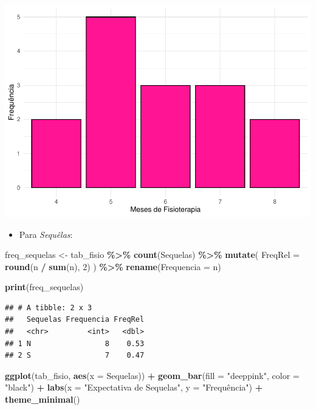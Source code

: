 \documentclass[
]{book}
\newenvironment{Shaded}{\begin{snugshade}}{\end{snugshade}}
\newcommand{\AttributeTok}[1]{\textcolor[rgb]{0.13,0.29,0.53}{#1}}
\newcommand{\DecValTok}[1]{\textcolor[rgb]{0.00,0.00,0.81}{#1}}
\newcommand{\FunctionTok}[1]{\textcolor[rgb]{0.13,0.29,0.53}{\textbf{#1}}}
\newcommand{\NormalTok}[1]{#1}
\newcommand{\OtherTok}[1]{\textcolor[rgb]{0.56,0.35,0.01}{#1}}
\newcommand{\SpecialCharTok}[1]{\textcolor[rgb]{0.81,0.36,0.00}{\textbf{#1}}}
\newcommand{\StringTok}[1]{\textcolor[rgb]{0.31,0.60,0.02}{#1}}
\providecommand{\tightlist}{%
  \setlength{\itemsep}{0pt}\setlength{\parskip}{0pt}}
\begin{document}
\begin{center}\includegraphics{AED_files/figure-latex/cap6_ex1bf-1} \end{center}

\begin{itemize}
\tightlist
\item
  Para \emph{Sequêlas}:
\end{itemize}

\begin{Shaded}
\begin{Highlighting}[]
\NormalTok{freq\_sequelas }\OtherTok{\textless{}{-}}\NormalTok{ tab\_fisio }\SpecialCharTok{\%\textgreater{}\%}
  \FunctionTok{count}\NormalTok{(Sequelas) }\SpecialCharTok{\%\textgreater{}\%}
  \FunctionTok{mutate}\NormalTok{(}
    \AttributeTok{FreqRel =} \FunctionTok{round}\NormalTok{(n }\SpecialCharTok{/} \FunctionTok{sum}\NormalTok{(n), }\DecValTok{2}\NormalTok{)}
\NormalTok{  ) }\SpecialCharTok{\%\textgreater{}\%}
  \FunctionTok{rename}\NormalTok{(}\AttributeTok{Frequencia =}\NormalTok{ n)}

\FunctionTok{print}\NormalTok{(freq\_sequelas)}
\end{Highlighting}
\end{Shaded}

\begin{verbatim}
## # A tibble: 2 x 3
##   Sequelas Frequencia FreqRel
##   <chr>         <int>   <dbl>
## 1 N                 8    0.53
## 2 S                 7    0.47
\end{verbatim}

\begin{Shaded}
\begin{Highlighting}[]
\FunctionTok{ggplot}\NormalTok{(tab\_fisio, }\FunctionTok{aes}\NormalTok{(}\AttributeTok{x =}\NormalTok{ Sequelas)) }\SpecialCharTok{+}
  \FunctionTok{geom\_bar}\NormalTok{(}\AttributeTok{fill =} \StringTok{"deeppink"}\NormalTok{, }\AttributeTok{color =} \StringTok{"black"}\NormalTok{) }\SpecialCharTok{+}
  \FunctionTok{labs}\NormalTok{(}\AttributeTok{x =} \StringTok{"Expectativa de Sequelas"}\NormalTok{, }\AttributeTok{y =} \StringTok{"Frequência"}\NormalTok{) }\SpecialCharTok{+}
  \FunctionTok{theme\_minimal}\NormalTok{()}
\end{Highlighting}
\end{Shaded}
\end{document}
